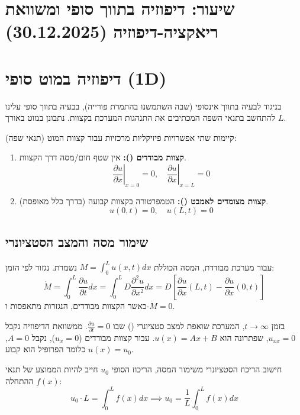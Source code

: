\section{שיעור: דיפוזיה בתווך סופי ומשוואת ריאקציה-דיפוזיה (30.12.2025)}

\section{דיפוזיה במוט סופי (1D)}
בניגוד לבעיה בתווך אינסופי (שבה השתמשנו בהתמרת פורייה), בבעיה בתווך סופי עלינו להתחשב בתנאי השפה המכתיבים את התנהגות המערכת בקצוות. נתבונן במוט באורך $L$.

\begin{definitionbox}{ (תנאי שפה)}
קיימות שתי אפשרויות פיזיקליות מרכזיות עבור קצוות המוט:
\begin{enumerate}
    \item \textbf{קצוות מבודדים ():} אין שטף חום/מסה דרך הקצוות.
    \[ \left. \frac{\partial u}{\partial x} \right|_{x=0} = 0, \quad \left. \frac{\partial u}{\partial x} \right|_{x=L} = 0 \]
    \item \textbf{קצוות מצומדים לאמבט ():} הטמפרטורה בקצוות קבועה (בדרך כלל מאופסת).
    \[ u(0, t) = 0, \quad u(L, t) = 0 \]
\end{enumerate}
\end{definitionbox}

\subsection{שימור מסה והמצב הסטציונרי}
עבור מערכת מבודדת, המסה הכוללת $M = \int_0^L u(x,t) dx$ נשמרת. נגזור לפי הזמן:
\[ \dot{M} = \int_0^L \frac{\partial u}{\partial t} dx = \int_0^L D \frac{\partial^2 u}{\partial x^2} dx = D \left[ \frac{\partial u}{\partial x}(L,t) - \frac{\partial u}{\partial x}(0,t) \right] \]
כאשר הקצוות מבודדים, הנגזרות מתאפסות ו-$\dot{M}=0$. 

בזמן $t \to \infty$, המערכת שואפת למצב סטציונרי () שבו $\frac{\partial u}{\partial t} = 0$. ממשוואת הדיפוזיה נקבל $u_{xx} = 0$, שפתרונה הוא $u(x) = Ax + B$. עבור קצוות מבודדים ($u_x=0$), נקבל $A=0$, כלומר הפרופיל הוא קבוע $u(x) = u_0$.

\begin{resultbox}{חישוב הריכוז הסטציונרי}
משימור המסה, הריכוז הסופי $u_0$ חייב להיות הממוצע של תנאי ההתחלה $f(x)$:
\[ u_0 \cdot L = \int_0^L f(x) dx \implies u_0 = \frac{1}{L} \int_0^L f(x) dx \]
\end{resultbox}

